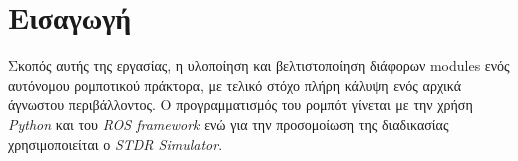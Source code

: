 \section*{Εισαγωγή}
Σκοπός αυτής της εργασίας, η υλοποίηση και βελτιστοποίηση διάφορων modules ενός αυτόνομου ρομποτικού πράκτορα, με τελικό στόχο πλήρη κάλυψη ενός αρχικά άγνωστου περιβάλλοντος. Ο προγραμματισμός του ρομπότ γίνεται με την χρήση \emph{Python} και του \emph{ROS framework} ενώ για την προσομοίωση της διαδικασίας χρησιμοποιείται ο \emph{STDR Simulator}.
